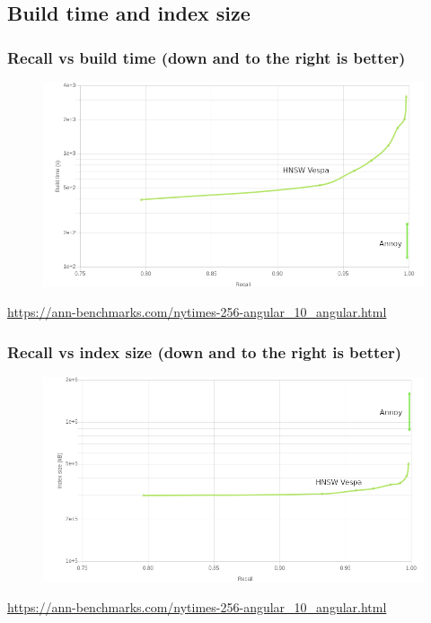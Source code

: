 \documentclass{beamer}
\begin{document}
\subsection{Build time and index size}

  \begin{frame}
    \frametitle{Recall vs build time (down and to the right is better)}  
  \begin{figure}[annoy_vs_hnsw_vespa_recall_vs_build_time_nytimes_labels]
    \vspace*{-0.1cm}
  	\includegraphics[scale=0.3]{annoy_vs_hnsw_vespa_recall_vs_build_time_nytimes_labels} 	
  \end{figure} 
  \vspace{-0.3cm}
  \scriptsize \centering \url{https://ann-benchmarks.com/nytimes-256-angular_10_angular.html} 
  \end{frame}


  \begin{frame}
    \frametitle{Recall vs index size (down and to the right is better)}  
  \begin{figure}[annoy_vs_hnsw_vespa_recall_vs_index_size_nytimes_labels]
    \vspace*{-0.1cm}
  	\includegraphics[scale=0.3]{annoy_vs_hnsw_vespa_recall_vs_index_size_nytimes_labels} 	
  \end{figure} 
  \vspace{-0.3cm}
  \scriptsize \centering \url{https://ann-benchmarks.com/nytimes-256-angular_10_angular.html} 
  \end{frame}
\end{document}
